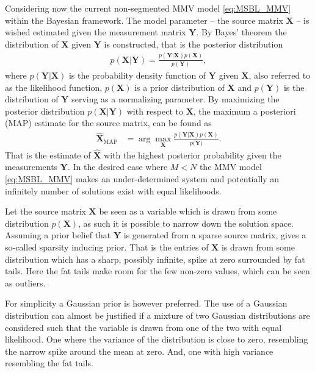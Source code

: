 Considering now the current non-segmented MMV model \eqref{eq:MSBL_MMV} within the Bayesian framework. The model parameter -- the source matrix $\textbf{X}$ -- is wished estimated given the measurement matrix $\textbf{Y}$.   
By Bayes' theorem the distribution of $\textbf{X}$ given $\textbf{Y}$ is constructed, that is the posterior distribution 
\begin{align*}
p(\mathbf{X}|\mathbf{Y}) = \frac{p(\mathbf{Y}|\mathbf{X}) p(\mathbf{X})}{p(\mathbf{Y})},
\end{align*}  
where $p(\mathbf{Y}|\mathbf{X})$ is the probability density function of $\mathbf{Y}$ given $\mathbf{X}$, also referred to as the likelihood function, $p(\mathbf{X})$ is a prior distribution of $\mathbf{X}$ and $p(\mathbf{Y})$ is the distribution of $\mathbf{Y}$ serving as a normalizing parameter.
By maximizing the posterior distribution $p(\mathbf{X}|\mathbf{Y})$ with respect to $\mathbf{X}$, the maximum a posteriori (MAP) estimate for the source matrix, can be found as
\begin{align*}
\hat{\mathbf{X}}_{\text{MAP}} &= \arg \max_{\mathbf{X}} \frac{p(\mathbf{Y} \vert \mathbf{X}) p(\mathbf{X})}{p(\mathbf{Y)}}.
\end{align*}
That is the estimate of $\hat{\mathbf{X}}$ with the highest posterior probability given the measurements $\mathbf{Y}$. 
In the desired case where $M < N$ the MMV model \eqref{eq:MSBL_MMV} makes an under-determined system and potentially an infinitely number of solutions exist with equal likelihoods.  

Let the source matrix $\mathbf{X}$ be seen as a variable which is drawn from some distribution $p(\mathbf{X})$, as such it is possible to narrow down the solution space. 
Assuming a prior belief that $\mathbf{Y}$ is generated from a sparse source matrix, gives a so-called sparsity inducing prior. 
That is the entries of $\mathbf{X}$ is drawn from some distribution which has a sharp, possibly infinite, spike at zero surrounded by fat tails. Here the fat tails make room for the few non-zero values, which can be seen as outliers.

For simplicity a Gaussian prior is however preferred. 
The use of a Gaussian distribution can almost be justified if a mixture of two Gaussian distributions are considered such that the variable is drawn from one of the two with equal likelihood. 
One where the variance of the distribution is close to zero, resembling the narrow spike around the mean at zero. 
And, one with high variance resembling the fat tails.       

